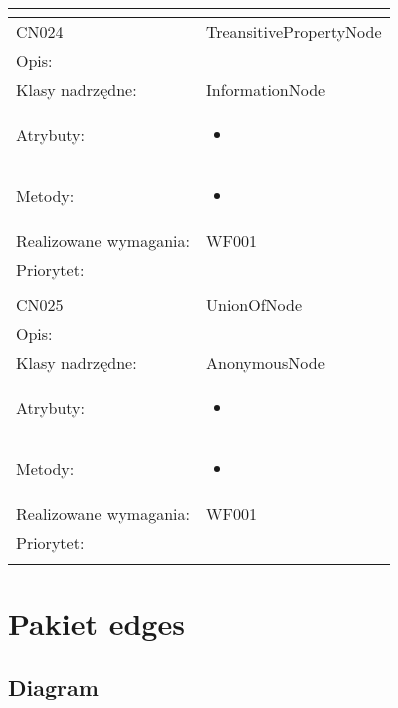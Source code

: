 \documentclass[a4paper,10pt]{article}
\begin{document}
\begin{center}
\begin{tabular}{|m{3cm}|m{9cm}|}
\multicolumn{2}{c}{} \\
 \hline

CN024 & TreansitivePropertyNode \\ \hline
Opis: &     \\ \hline
Klasy nadrzędne: & InformationNode     \\ \hline
Atrybuty: & \begin{itemize}
 \item 
\end{itemize}
 \\ \hline
Metody: & \begin{itemize}
 \item 
\end{itemize}
  \\ \hline
Realizowane wymagania: & WF001 \\ \hline
Priorytet: &  \\ \hline

\multicolumn{2}{c}{} \\
 \hline

CN025 & UnionOfNode \\ \hline
Opis: &     \\ \hline
Klasy nadrzędne: & AnonymousNode     \\ \hline
Atrybuty: & \begin{itemize}
 \item 
\end{itemize}
 \\ \hline
Metody: & \begin{itemize}
 \item 
\end{itemize}
  \\ \hline
Realizowane wymagania: & WF001 \\ \hline
Priorytet: &  \\ \hline

\multicolumn{2}{c}{} \\
 \hline


\end{tabular}

\end{center}

\section{Pakiet edges}

\subsection{Diagram}
\end{document}
